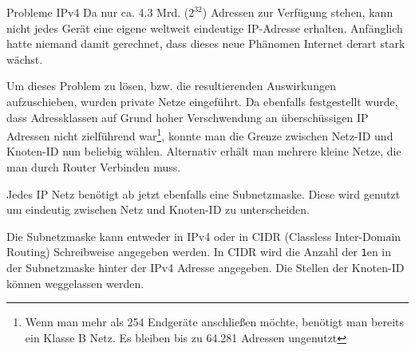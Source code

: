 \begin{bonus}{Probleme IPv4}
    Da nur ca. 4.3 Mrd. ($2^{32}$) Adressen zur Verfügung stehen, kann nicht jedes Gerät eine eigene weltweit eindeutige IP-Adresse erhalten.
    Anfänglich hatte niemand damit gerechnet, dass dieses neue Phänomen Internet derart stark wächst.

    Um dieses Problem zu lösen, bzw. die resultierenden Auswirkungen aufzuschieben, wurden private Netze eingeführt.
    Da ebenfalls festgestellt wurde, dass Adressklassen auf Grund hoher Verschwendung an überschüssigen IP Adressen nicht zielführend war\footnote{
        Wenn man mehr als 254 Endgeräte anschließen möchte, benötigt man bereits ein Klasse B Netz.
        Es bleiben bis zu 64.281 Adressen ungenutzt
    }, konnte man die Grenze zwischen Netz-ID und Knoten-ID nun beliebig wählen.
    Alternativ erhält man mehrere kleine Netze, die man durch Router Verbinden muss.

    Jedes IP Netz benötigt ab jetzt ebenfalls eine Subnetzmaske.
    Diese wird genutzt um eindeutig zwischen Netz und Knoten-ID zu unterscheiden.

    Die Subnetzmaske kann entweder in IPv4 oder in CIDR (Classless Inter-Domain Routing) Schreibweise angegeben werden.
    In CIDR wird die Anzahl der \texttt{1}en in der Subnetzmaske hinter der IPv4 Adresse angegeben. Die Stellen der Knoten-ID können weggelassen werden.


\end{bonus}
